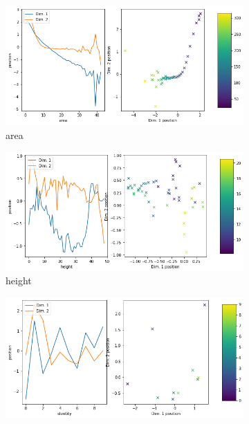\documentclass[11pt,a4paper]{article}
\begin{document}
\begin{figure}[H]
\centering
\begin{subfigure}{.48\textwidth}
\includegraphics[width=\textwidth]{images/latent_space_traversals/vae_mnist_morpho_latent_space_values_area.png}
\caption{area}
\end{subfigure}
\hfill
\begin{subfigure}{.48\textwidth}
\includegraphics[width=\textwidth]{images/latent_space_traversals/vae_mnist_morpho_latent_space_values_height.png}
\caption{height}
\end{subfigure}
\begin{subfigure}{.48\textwidth}
\includegraphics[width=\textwidth]{images/latent_space_traversals/vae_mnist_morpho_latent_space_values_identity.png}

\end{subfigure}
\end{figure}
\end{document}
